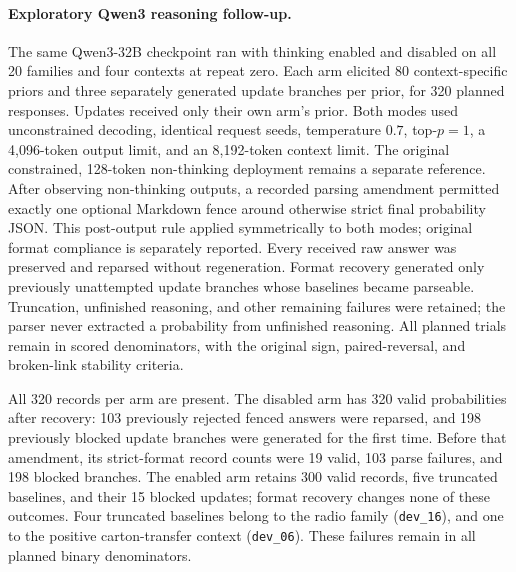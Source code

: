 \paragraph{Exploratory Qwen3 reasoning follow-up.}
The same Qwen3-32B checkpoint ran with thinking enabled and disabled on all
20 families and four contexts at repeat zero. Each arm elicited 80
context-specific priors and three separately generated update branches per
prior, for 320 planned responses. Updates received only their own arm's prior.
Both modes used unconstrained decoding, identical request seeds, temperature
$0.7$, top-$p=1$, a 4,096-token output limit, and an 8,192-token context limit.
The original constrained, 128-token non-thinking deployment remains a separate
reference. After observing non-thinking outputs, a recorded parsing amendment
permitted exactly one optional Markdown fence around otherwise strict final
probability JSON. This post-output rule applied symmetrically to both modes;
original format compliance is separately reported. Every received raw
answer was preserved and reparsed without regeneration. Format recovery
generated only previously unattempted update branches whose baselines became
parseable. Truncation, unfinished reasoning, and other remaining failures were
retained; the parser never extracted a probability from unfinished reasoning.
All planned trials remain in scored denominators, with the original sign,
paired-reversal, and broken-link stability criteria.

\begin{center}
\begin{minipage}{\linewidth}
\centering
{}
\label{tab:exp1-context-reasoning}
\small
\resizebox{\linewidth}{!}{}
\end{minipage}
\end{center}

All 320 records per arm are present. The disabled arm has 320 valid probabilities
after recovery: 103 previously rejected fenced answers were reparsed, and 198
previously blocked update branches were generated for the first time. Before
that amendment, its strict-format record counts were 19 valid, 103 parse
failures, and 198 blocked branches. The enabled arm retains 300 valid records,
five truncated baselines, and their 15 blocked updates; format recovery changes
none of these outcomes. Four truncated baselines belong to the radio family
(\texttt{dev\_16}), and one to the positive carton-transfer context
(\texttt{dev\_06}). These failures remain in all planned binary denominators.

